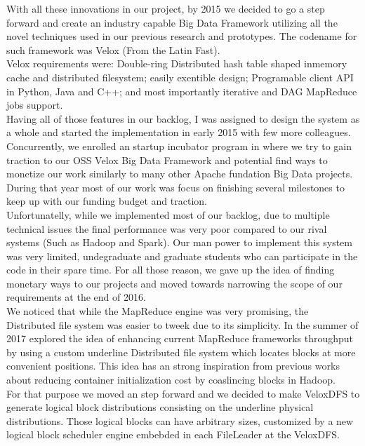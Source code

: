 With all these innovations in our project, by 2015 we decided to go a step forward and create an industry capable Big Data Framework utilizing all the novel techniques used in our previous research and prototypes. The codename for such framework was Velox (From the Latin Fast). \\
Velox requirements were: Double-ring Distributed hash table shaped inmemory cache and distributed filesystem; easily exentible design; Programable client API in Python, Java and C++; and most importantly iterative and DAG MapReduce jobs support. \\

Having all of those features in our backlog, I was assigned to design the system as a whole and started the implementation in early 2015 with few more colleagues. Concurrently, we enrolled an startup incubator program in where we try to gain traction to our OSS Velox Big Data Framework and potential find ways to monetize our work similarly to many other Apache fundation Big Data projects. \\
During that year most of our work was focus on finishing several milestones to keep up with our funding budget and traction. \\

Unfortunatelly, while we implemented most of our backlog, due to multiple technical issues the final performance was very poor compared to our rival systems (Such as Hadoop and Spark). Our man power to implement this system was very limited, undegraduate and graduate students who can participate in the code in their spare time. For all those reason, we gave up the idea of finding monetary ways to our projects and moved towards narrowing the scope of our requirements at the end of 2016. \\

We noticed that while the MapReduce engine was very promising, the Distributed file system was easier to tweek due to its simplicity. In the summer of 2017 explored the idea of enhancing current MapReduce frameworks throughput by using a custom underline Distributed file system which locates blocks at more convenient positions. This idea has an strong inspiration from previous works about reducing container initialization cost by coaslincing blocks in Hadoop. \\

For that purpose we moved an step forward and we decided to make VeloxDFS to generate logical block distributions consisting on the underline physical distributions. Those logical blocks can have arbitrary sizes, customized by a new logical block scheduler engine embebded in each FileLeader at the VeloxDFS. \\

